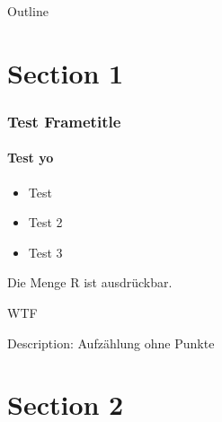 \begin{frame}{}
	\titlepage
\end{frame}

\begin{frame}{Outline}\label{tableofcontents}
   \tableofcontents
\end{frame}







\section{Section 1}
\begin{frame}
	\frametitle{Test Frametitle}
	\framesubtitle{Test yo}

    \begin{itemize}
	\item Test
	\item Test 2
	\item Test 3
    \end{itemize}
    \begin{description}
      \item[${G_3}'$:] Die Menge R ist ausdrückbar.
      \item WTF
      \item [Das hier:] Description: Aufzählung ohne Punkte
    \end{description}
\end{frame}



\section{Section 2}
